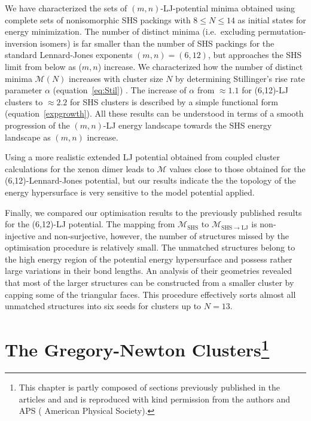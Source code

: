 We have characterized the sets of $(m,n)$-LJ-potential minima obtained using
complete sets of nonisomorphic \ac{SHS} packings with $8 \leq N \leq 14$
\autocite{Arkus_Minimalenergyclusters_2009,Arkus_DerivingFiniteSphere_2011,Hoy_Structurefinitesphere_2012,Hoy_Structuredynamicsmodel_2015,Holmes-Cerfon_EnumeratingRigidSphere_2016}
as initial states for energy minimization.  The number of distinct minima
(i.e.~excluding permutation-inversion isomers) is far smaller than the number
of \ac{SHS} packings for the standard Lennard-Jones exponents $(m,n) = (6,12)$, but
approaches the \ac{SHS} limit from below as ($m,n$) increase.  We characterized how
the number of distinct minima $\mathcal{M}(N)$ increases with cluster size $N$
by determining Stillinger's rise rate parameter $\alpha$ (equation~\eqref{eq:Stil})
\autocite{Stillinger_Exponentialmultiplicityinherent_1999}.  The increase of
$\alpha$ from $\approx 1.1$ for (6,12)-LJ clusters to $\approx 2.2$ for \ac{SHS}
clusters is described by a simple functional form (equation~\eqref{expgrowth}).  All
these results  can be understood in terms of a smooth progression of the
$(m,n)$-LJ energy landscape towards the \ac{SHS} energy landscape as $(m,n)$
increase.

Using a more realistic extended LJ potential obtained from coupled cluster
calculations for the xenon dimer
\autocite{Schwerdtfeger_ExtensionLennardJonespotential_2006,Jerabek_relativisticcoupledclusterinteraction_2017}
leads to $\mathcal{M}$ values close to those obtained for the
(6,12)-Lennard-Jones potential, but our results indicate the the topology of
the energy hypersurface is very sensitive to the model potential applied.  

Finally, we compared our optimisation results to the previously published
results for the (6,12)-LJ potential. The mapping from $\mathcal{M}_\text{SHS}$
to $\mathcal{M}_\mathrm{SHS\to LJ}$ is non-injective and non-surjective,
however, the number of structures missed by the optimisation procedure is
relatively small. The unmatched structures belong to the high energy region of
the potential energy hypersurface and possess rather large variations in their
bond lengths. An analysis of their geometries revealed that most of the larger
structures can be constructed from a smaller cluster by capping some of the
triangular faces. This procedure effectively sorts almost all unmatched
structures into six seeds for clusters up to $N=13$.


\chapter[The Gregory-Newton Clusters]{
    The Gregory-Newton Clusters\footnote{This chapter is partly composed of
    sections previously published in the articles
    \autocite{Trombach_stickyhardsphereLennardJonestypeclusters_2018}
    and
    \autocite{Trombach_GregoryNewtonproblemkissing_2018}
    and is reproduced with kind permission from the authors and APS
    ( American Physical Society).}
}
\label{sec:thegregorynewtonclusters}

